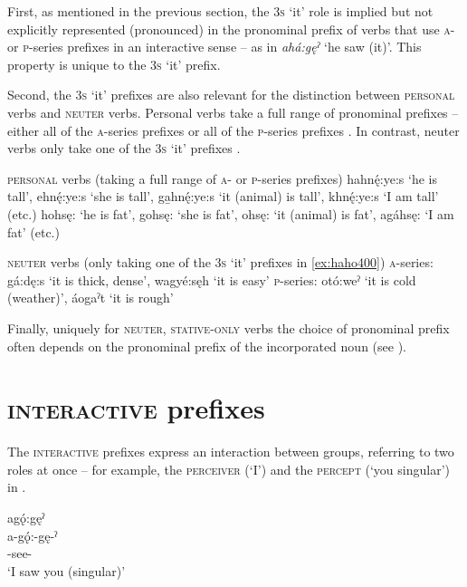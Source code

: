 First, as mentioned in the previous section, the \textsc{3s} ‘it’ role is implied but not explicitly represented (pronounced) in the pronominal prefix of verbs that use  \textsc{a}- or \textsc{p}-series prefixes in an interactive sense -- as in \textit{ahá:gęˀ} ‘he saw (it)’. This property is unique to the \textsc{3s} ‘it’ prefix.

Second, the \textsc{3s} ‘it’ prefixes are also relevant for the distinction between \textsc{personal} verbs and \textsc{neuter} verbs. Personal verbs take a full range of pronominal prefixes -- either all of the \textsc{a}-series prefixes  or all of the \textsc{p}-series prefixes . In contrast, neuter verbs only take one of the \textsc{3s} ‘it’ prefixes . 

\ea\label{ex:haho800} \textsc{personal} verbs (taking a full range of \textsc{a}- or \textsc{p}-series prefixes)
\ea\label{ex:haho800a} hahnę́:ye:s ‘he is tall’, ehnę́:ye:s ‘she is tall’, ga̱hnę́:ye:s ‘it (animal) is tall’, khnę́:ye:s ‘I am tall’ (etc.)
\ex\label{ex:haho800b} hohsę: ‘he is fat’, gohsę: ‘she is fat’, ohsę: ‘it (animal) is fat’, agáhsę: ‘I am fat’ (etc.)
\z
\z

\ea\label{ex:haho900} \textsc{neuter} verbs (only taking one of the \textsc{3s} ‘it’ prefixes in \ref{ex:haho400})
\ea\label{ex:haho900a} \textsc{a}-series: gá:dę:s ‘it is thick, dense’, wagyé:sęh ‘it is easy’
\ex\label{ex:haho900b} \textsc{p}-series: otó:weˀ ‘it is cold (weather)’, áogaˀt ‘it is rough’
\z
\z

Finally, uniquely for \textsc{neuter}, \textsc{stative-only} verbs the choice of pronominal prefix often depends on the pronominal prefix of the incorporated noun (see ). 


\section{\textsc{interactive} prefixes} \label{gǫ (interactive) prefixes}
The \textsc{interactive} prefixes express an interaction between groups, referring to two roles at once -- for example, the \textsc{perceiver} (‘I’) and the \textsc{percept} (‘you singular’) in .

\ea\label{ex:interex100} agǫ́:gęˀ\\
\gll a-gǫ́:-gę-ˀ\\
{\factual}-see-{\punctual}\\
\glt ‘I saw you (singular)’
\z

